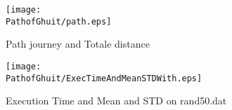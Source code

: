 \begin{figure}[H]
	\begin{minipage}[t]{0.45\linewidth}
	\centering
	\texttt{[image: \\PathofGhuit/path.eps]}
	\caption{Path journey and Totale distance}\label{fig:PathofGhuit:path}
	
	\end{minipage}\hfill
	\begin{minipage}[t]{0.45\linewidth}
	\centering
	\texttt{[image: \\PathofGhuit/ExecTimeAndMeanSTDWith.eps]}
	\caption{Execution Time and Mean and STD on rand50.dat}
	\label{fig:PathofGhuit:AS_1_5AS_ExecTimeAndMeanSTDWith_execVariation}
	\end{minipage}
\end{figure}